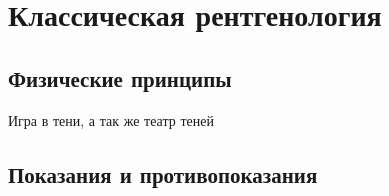 \section{Классическая рентгенология}
\subsection{Физические принципы}
Игра в тени, а так же театр теней
\subsection{Показания и противопоказания}